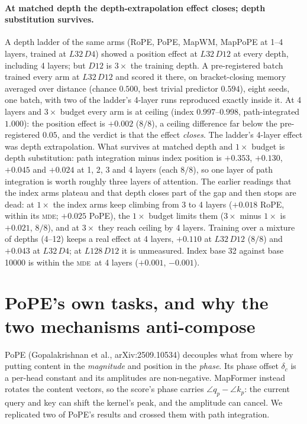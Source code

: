 \documentclass[10pt]{article}
\newcommand{\mde}{\textsc{mde}}
\begin{document}
\paragraph{At matched depth the depth-extrapolation effect closes; depth substitution survives.} A depth
ladder of the same arms (RoPE, PoPE, MapWM, MapPoPE at 1--4 layers, trained at $L32\,D4$) showed a position
effect at $L32\,D12$ at every depth, including 4 layers; but $D12$ is $3\times$ the training depth. A
pre-registered batch trained every arm at $L32\,D12$ and scored it there, on bracket-closing memory averaged over
distance (chance $0.500$, best trivial predictor $0.594$), eight seeds, one batch, with two of the ladder's 4-layer
runs reproduced exactly inside it. At 4 layers and $3\times$ budget every arm is at ceiling (index
$0.997$--$0.998$, path-integrated $1.000$): the position effect is $+0.002$ ($8/8$), a ceiling difference far
below the pre-registered $0.05$, and the verdict is that the effect \emph{closes}. The ladder's 4-layer effect
was depth extrapolation. What survives at matched depth and $1\times$ budget is depth substitution: path
integration minus index position is $+0.353$, $+0.130$, $+0.045$ and $+0.024$ at 1, 2, 3 and 4 layers (each
$8/8$), so one layer of path integration is worth roughly three layers of attention. The earlier readings that
the index arms plateau and that depth closes part of the gap and then stops are dead: at $1\times$ the index
arms keep climbing from 3 to 4 layers ($+0.018$ RoPE, within its \mde; $+0.025$ PoPE), the $1\times$ budget limits them ($3\times$
minus $1\times$ is $+0.021$, $8/8$), and at $3\times$ they reach ceiling by 4 layers. Training over a mixture of
depths (4--12) keeps a real effect at 4 layers, $+0.110$ at $L32\,D12$ ($8/8$) and $+0.043$ at $L32\,D4$; at
$L128\,D12$ it is unmeasured. Index base 32 against base 10000 is within the \mde\ at 4 layers ($+0.001$,
$-0.001$).

\section{PoPE's own tasks, and why the two mechanisms anti-compose}
\label{sec:pope-tasks}

PoPE (Gopalakrishnan et al., arXiv:2509.10534) decouples what from where by putting content in the
\emph{magnitude} and position in the \emph{phase}. Its phase offset $\delta_c$ is a per-head constant and its
amplitudes are non-negative. MapFormer instead rotates the content vectors, so the score's phase carries
$\angle q_p-\angle k_p$: the current query and key can shift the kernel's peak, and the amplitude can cancel.
We replicated two of PoPE's results and crossed them with path integration.
\end{document}
